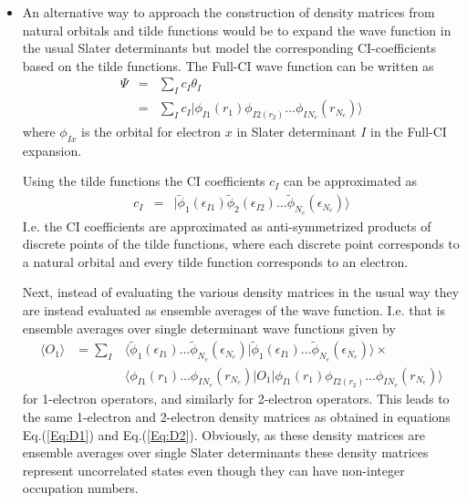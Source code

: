 \documentclass[aip,graphicx]{revtex4-1}
\begin{document}
\begin{itemize}
    \item An alternative way to approach the construction of density matrices from natural orbitals and tilde functions would be to expand the wave function in the usual Slater determinants but model the corresponding CI-coefficients based on the tilde functions. The Full-CI wave function can be written as
    \begin{eqnarray}
    \Psi &=& \sum_I c_I \theta_I \\
         &=& \sum_I c_I |\phi_{I1}(r_1)\phi_{I2(r_2)}\ldots\phi_{IN_e}(r_{N_e})\rangle
    \end{eqnarray}
    where $\phi_{Ix}$ is the orbital for electron $x$ in Slater determinant $I$ in the Full-CI expansion.
    
    Using the tilde functions the CI coefficients $c_I$ can be approximated as
    \begin{eqnarray}
    c_I &=& |\tilde{\phi}_1(\epsilon_{I1})\tilde{\phi}_2(\epsilon_{I2})\ldots\tilde{\phi}_{N_e}(\epsilon_{N_e})\rangle
    \end{eqnarray}
    I.e. the CI coefficients are approximated as anti-symmetrized products of discrete points of the tilde functions, where each discrete point corresponds to a natural orbital and every tilde function corresponds to an electron. 
    
    Next, instead of evaluating the various density matrices in the usual way they are instead evaluated as ensemble averages of the wave function. I.e. that is ensemble averages over single determinant wave functions given by
    \begin{eqnarray}
    \langle O_1\rangle 
    &= \sum_I& \langle\tilde{\phi}_1(\epsilon_{I1})\ldots\tilde{\phi}_{N_e}(\epsilon_{N_e})|\tilde{\phi}_1(\epsilon_{I1})\ldots\tilde{\phi}_{N_e}(\epsilon_{N_e})\rangle\times \nonumber \\
    &&         \langle\phi_{I1}(r_1)\ldots\phi_{IN_e}(r_{N_e})|O_1|\phi_{I1}(r_1)\phi_{I2(r_2)}\ldots\phi_{IN_e}(r_{N_e})\rangle
    \end{eqnarray}
    for 1-electron operators, and similarly for 2-electron operators.
    This leads to the same 1-electron and 2-electron density matrices as obtained in equations Eq.(\ref{Eq:D1}) and Eq.(\ref{Eq:D2}). Obviously, as these density matrices are ensemble averages over single Slater determinants these density matrices represent uncorrelated states even though they can have non-integer occupation numbers.
    
    

\end{itemize}
\end{document}
